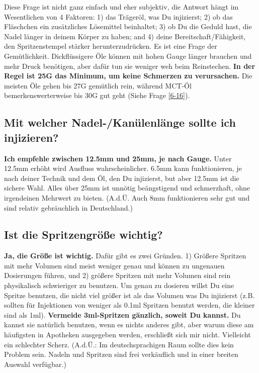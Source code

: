 \documentclass{article}
\begin{document}
{Diese Frage ist nicht ganz einfach und eher subjektiv, die Antwort hängt im Wesentlichen von 4 Faktoren: 1) das Trägeröl, was Du injizierst; 2) ob das Fläschchen ein zusätzliches Lösemittel beinhaltet; 3) ob Du die Geduld hast, die Nadel länger in deinem Körper zu haben; and 4) deine Bereitschaft/Fähigkeit, den Spritzenstempel stärker herunterzudrücken. Es ist eine Frage der Gemütlichkeit. Dickflüssigere Öle können mit hohen Gauge länger brauchen und mehr Druck benötigen, aber dafür tun sie weniger weh beim Reinstechen. \textbf{In der Regel ist 25G das Minimum, um keine Schmerzen zu verursachen. }Die meisten Öle gehen bis 27G gemütlich rein, während MCT-Öl bemerkenswerterweise bis 30G gut geht (Siehe Frage \ref{6-16}).

\subsection{Mit welcher Nadel-/Kanülenlänge sollte ich injizieren?}

\textbf{Ich empfehle zwischen 12.5mm und 25mm, je nach Gauge.} Unter 12.5mm erhöht wird Ausfluss wahrscheinlicher. 6.5mm kann funktionieren, je nach deiner Technik und dem Öl, den Du injizierst, but aber 12.5mm ist die sichere Wahl. Alles über 25mm ist unnötig beängstigend und schmerzhaft, ohne irgendeinen Mehrwert zu bieten. (A.d.Ü. Auch 8mm funktionieren sehr gut und sind relativ gebräuchlich in Deutschland.)

\subsection{Ist die Spritzengröße wichtig?}

\textbf{Ja, die Größe ist wichtig.} Dafür gibt es zwei Gründen. 1) Größere Spritzen mit mehr Volumen sind meist weniger genau und können zu ungenauen Dosierungen führen, und 2) größere Spritzen mit mehr Volumen sind rein physikalisch schwieriger zu benutzen. Um genau zu dosieren willst Du eine Spritze benutzen, die nicht viel größer ist als das Volumen was Du injizierst (z.B. sollten für Injektionen von weniger als 0.1ml Spritzen benutzt werden, die kleiner sind als 1ml). \textbf{Vermeide 3ml-Spritzen gänzlich, soweit Du kannst.} Du kannst sie natürlich benutzen, wenn es nichts anderes gibt, aber warum diese am häufigsten in Apotheken ausgegeben werden, erschließt sich mir nicht. Vielleicht ein schlechter Scherz. (A.d.Ü.: Im deutschsprachigen Raum sollte dies kein Problem sein. Nadeln und Spritzen sind frei verkäuflich und in einer breiten Auswahl verfügbar.)

}
\end{document}
